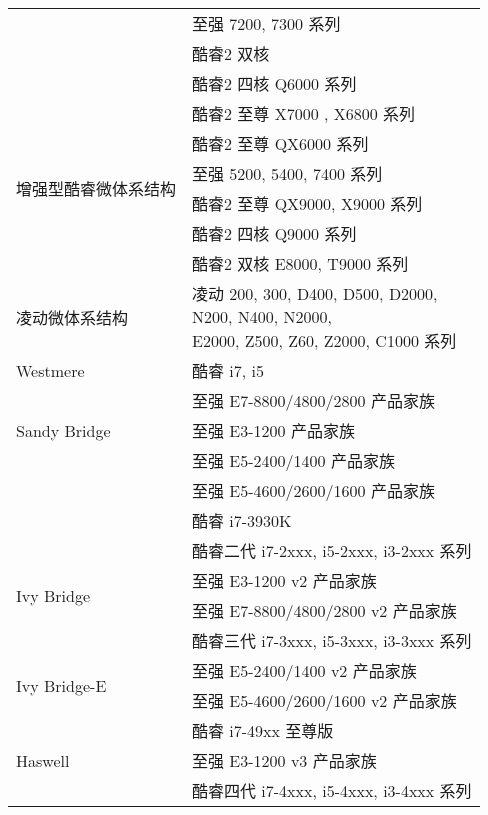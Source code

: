 \begin{multicols}{2}
\begin{table}[H]
\begin{tabular}{|l|l|}
\cline{2-2}          & 至强 7200, 7300 系列 \\
\cline{2-2}          & 酷睿2 双核 \\
\cline{2-2}          & 酷睿2 四核 Q6000 系列 \\
\cline{2-2}          & 酷睿2 至尊 X7000 , X6800 系列 \\
\cline{2-2}          & 酷睿2 至尊 QX6000 系列 \\
    \hline
    \multirow{2}[8]{*}{增强型酷睿微体系结构} & 至强 5200, 5400, 7400 系列 \\
\cline{2-2}          & 酷睿2 至尊 QX9000, X9000 系列 \\
\cline{2-2}          & 酷睿2 四核 Q9000 系列 \\
\cline{2-2}          & 酷睿2 双核 E8000, T9000 系列 \\
    \hline
    凌动微体系结构 & \multicolumn{1}{p{17.39em}|}{凌动 200, 300, D400, D500, D2000,\newline{}N200, N400, N2000,\newline{}E2000, Z500, Z60, Z2000, C1000 系列} \\
    \hline
    Westmere & 酷睿 i7, i5 \\
    \hline
    \multirow{3}[12]{*}{Sandy Bridge} & 至强 E7-8800/4800/2800 产品家族 \\
\cline{2-2}          & 至强 E3-1200 产品家族 \\
\cline{2-2}          & 至强 E5-2400/1400 产品家族 \\
\cline{2-2}          & 至强 E5-4600/2600/1600 产品家族 \\
\cline{2-2}          & 酷睿 i7-3930K \\
\cline{2-2}          & 酷睿二代 i7-2xxx, i5-2xxx, i3-2xxx 系列 \\
    \hline
    \multirow{2}[6]{*}{Ivy Bridge} & 至强 E3-1200 v2 产品家族 \\
\cline{2-2}          & 至强 E7-8800/4800/2800 v2 产品家族 \\
\cline{2-2}          & 酷睿三代 i7-3xxx, i5-3xxx, i3-3xxx 系列 \\
    \hline
    \multirow{2}[6]{*}{Ivy Bridge-E} & 至强 E5-2400/1400 v2 产品家族 \\
\cline{2-2}          & 至强 E5-4600/2600/1600 v2 产品家族 \\
\cline{2-2}          & 酷睿 i7-49xx 至尊版 \\
    \hline
    \multirow{1}[4]{*}{Haswell} & 至强 E3-1200 v3 产品家族 \\
\cline{2-2}          & 酷睿四代 i7-4xxx, i5-4xxx, i3-4xxx 系列 \\

\end{tabular}
\end{table}
\end{multicols}
